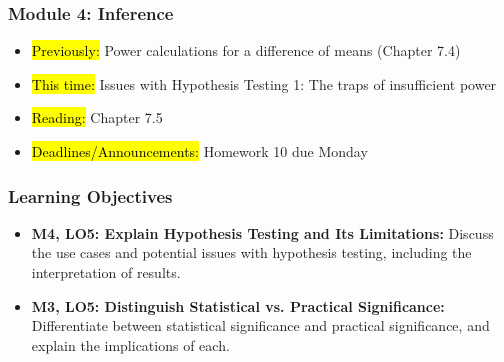 
\begin{frame}
    \frametitle{Module 4: Inference}
    \begin{itemize}
        \item \hl{Previously: }Power calculations for a difference of means (Chapter 7.4)
        \item \hl{This time: }Issues with Hypothesis Testing 1: The traps of insufficient power
        \item \hl{Reading: }Chapter 7.5
        \item \hl{Deadlines/Announcements: }Homework 10 due Monday
    \end{itemize}

\end{frame}

\begin{frame}
    \frametitle{Learning Objectives}
    \begin{itemize}
        \item \textbf{M4, LO5: Explain Hypothesis Testing and Its Limitations:} Discuss the use cases and potential issues with hypothesis testing, including the interpretation of results.
        \item \textbf{M3, LO5: Distinguish Statistical vs. Practical Significance:} Differentiate between statistical significance and practical significance, and explain the implications of each.
    \end{itemize}
\end{frame}
